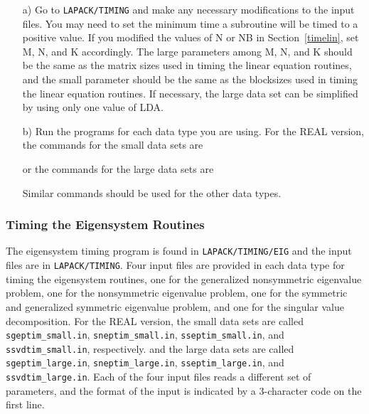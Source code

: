 \documentclass[11pt]{report}
\begin{document}
\begin{itemize}

\item[a)]
Go to \texttt{LAPACK/TIMING} and
make any necessary modifications to the input files.
You may need to set the minimum time a subroutine will
be timed to a positive value.
If you modified the values of N or NB 
in Section~\ref{timelin}, set M, N, and K accordingly.
The large parameters among M, N, and K
should be the same as the matrix sizes used in timing the linear
equation routines,
and the small parameter should be the same as the
blocksizes used in timing the linear equation routines.
If necessary, the large data set can be simplified by using only one
value of LDA.

\item[b)]
Run the programs for each data type you are using. 
For the REAL version, the commands for the small data sets are

or the commands for the large data sets are

\noindent
Similar commands should be used for the other data types.
\end{itemize}

\subsubsection{Timing the Eigensystem Routines}\label{timeeig}

The eigensystem timing program is found in \texttt{LAPACK/TIMING/EIG}
and the input files are in \texttt{LAPACK/TIMING}.
Four input files are provided in each data type for timing the
eigensystem routines,
one for the generalized nonsymmetric eigenvalue problem, 
one for the nonsymmetric eigenvalue problem, 
one for the symmetric and generalized symmetric eigenvalue problem,
and one for the singular value decomposition.
For the REAL version, the small data sets are called \texttt{sgeptim\_small.in},
\texttt{sneptim\_small.in}, \texttt{sseptim\_small.in}, and \texttt{ssvdtim\_small.in}, respectively.
and the large data sets are called \texttt{sgeptim\_large.in}, \texttt{sneptim\_large.in},
\texttt{sseptim\_large.in}, and \texttt{ssvdtim\_large.in}.
Each of the four input files reads a different set of parameters,
and the format of the input is indicated by a 3-character code
on the first line.
\end{document}
